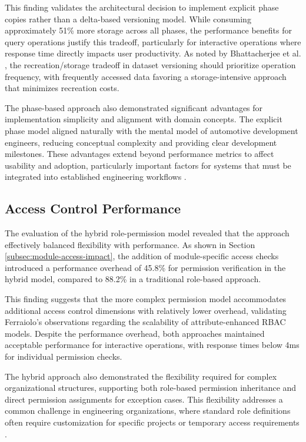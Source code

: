 This finding validates the architectural decision to implement explicit phase copies rather than a delta-based versioning model. While consuming approximately 51\% more storage across all phases, the performance benefits for query operations justify this tradeoff, particularly for interactive operations where response time directly impacts user productivity. As noted by Bhattacherjee et al. \cite{bhattacherjee2015principles}, the recreation/storage tradeoff in dataset versioning should prioritize operation frequency, with frequently accessed data favoring a storage-intensive approach that minimizes recreation costs.

The phase-based approach also demonstrated significant advantages for implementation simplicity and alignment with domain concepts. The explicit phase model aligned naturally with the mental model of automotive development engineers, reducing conceptual complexity and providing clear development milestones. These advantages extend beyond performance metrics to affect usability and adoption, particularly important factors for systems that must be integrated into established engineering workflows \cite{nielsen1994usability}.

\subsection{Access Control Performance}
\label{subsec:access-control-performance}

The evaluation of the hybrid role-permission model revealed that the approach effectively balanced flexibility with performance. As shown in Section \ref{subsec:module-access-impact}, the addition of module-specific access checks introduced a performance overhead of 45.8\% for permission verification in the hybrid model, compared to 88.2\% in a traditional role-based approach.

This finding suggests that the more complex permission model accommodates additional access control dimensions with relatively lower overhead, validating Ferraiolo's observations \cite{ferraiolo2011policy} regarding the scalability of attribute-enhanced RBAC models. Despite the performance overhead, both approaches maintained acceptable performance for interactive operations, with response times below 4ms for individual permission checks.

The hybrid approach also demonstrated the flexibility required for complex organizational structures, supporting both role-based permission inheritance and direct permission assignments for exception cases. This flexibility addresses a common challenge in engineering organizations, where standard role definitions often require customization for specific projects or temporary access requirements \cite{sandhu1997arbac97}.

